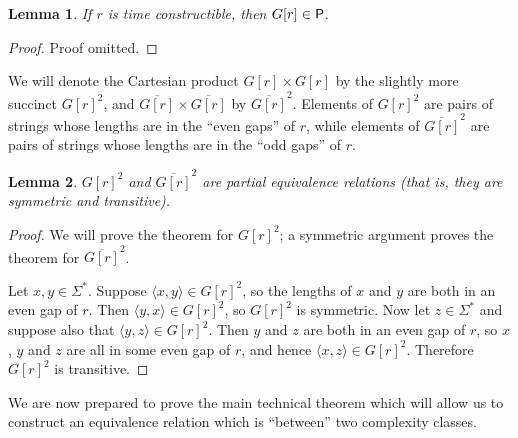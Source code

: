\documentclass[draft]{article}
\newtheorem{lemma}[lemma]{Lemma}
\theoremstyle{definition} \newtheorem{openproblem}[openproblem]{Open problem}
\theoremstyle{definition} \newtheorem{definition}[definition]{Definition}
\theoremstyle{remark} \newtheorem{remark}{Remark}
\newcommand{\defn}[1]{\emph{#1}} %
\newcommand{\pair}[2]{\langle#1,#2\rangle} %
\begin{document}
\begin{lemma}\label{lem:gap_p}
  If $r$ is time constructible, then $G[r]\in\P$.
\end{lemma}
\begin{proof}
  Proof omitted.
\end{proof}

We will denote the Cartesian product $G[r]\times G[r]$ by the slightly more succinct ${G[r]}^2$, and $\overline{G[r]}\times\overline{G[r]}$ by $\overline{G[r]}^2$.
Elements of ${G[r]}^2$ are pairs of strings whose lengths are in the ``even gaps'' of $r$, while elements of $\overline{G[r]}^2$ are pairs of strings whose lengths are in the ``odd gaps'' of $r$.

\begin{lemma}
  ${G[r]}^2$ and $\overline{G[r]}^2$ are \defn{partial equivalence relations} (that is, they are symmetric and transitive).
\end{lemma}
\begin{proof}
  We will prove the theorem for ${G[r]}^2$; a symmetric argument proves the theorem for $\overline{G[r]}^2$.

  Let $x,y\in\Sigma^*$.
  Suppose $\pair{x}{y}\in {G[r]}^2$, so the lengths of $x$ and $y$ are both in an even gap of $r$.
  Then $\pair{y}{x}\in{G[r]}^2$, so ${G[r]}^2$ is symmetric.
  Now let $z\in\Sigma^*$ and suppose also that $\pair{y}{z}\in {G[r]}^2$.
  Then $y$ and $z$ are both in an even gap of $r$, so $x$, $y$ and $z$ are all in some even gap of $r$, and hence $\pair{x}{z}\in {G[r]}^2$.
  Therefore ${G[r]}^2$ is transitive.
\end{proof}

We are now prepared to prove the main technical theorem which will allow us to construct an equivalence relation which is ``between'' two complexity classes.
\end{document}
